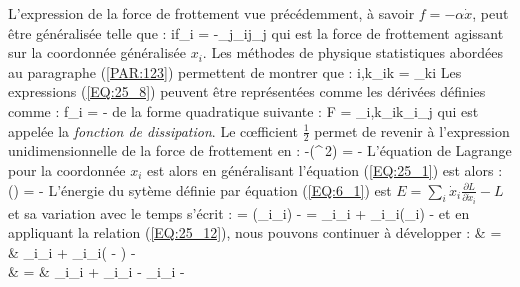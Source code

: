 L'expression de la force de frottement vue pr\'{e}c\'{e}demment, \`{a} savoir $f = -\alpha\dot{x}$, peut \^{e}tre g\'{e}n\'{e}ralis\'{e}e telle que :
\be
	\forall i\text{, }f_{i} = -\sum_{j}\alpha_{ij}_{j} \label{EQ:25_8}
\ee
qui est la force de frottement agissant sur la coordonn\'{e}e g\'{e}n\'{e}ralis\'{e}e $x_{i}$. Les m\'{e}thodes de physique statistiques abord\'{e}es au paragraphe (\ref{PAR:123}) permettent de montrer que :
\benn
	\forall i,k\text{, }\alpha_{ik} = \alpha_{ki} \label{EQ:25_9}
\eenn
Les expressions (\ref{EQ:25_8}) peuvent \^{e}tre repr\'{e}sent\'{e}es comme les d\'{e}riv\'{e}es d\'{e}finies comme :
\be
	f_{i} = - \label{EQ:25_10}
\ee
de la forme quadratique suivante :
\be
	F = \sum_{i,k}\alpha_{ik}_{i}_{j}  \label{EQ:25_11}
\ee
qui est appel\'{e}e la \emph{fonction de dissipation}. Le c{\oe}fficient $\frac{1}{2}$ permet de revenir \`{a} l'expression unidimensionnelle de la force de frottement en :
\benn
	-\left(^{\,2}\right) = -\alpha{}
\eenn
L'\'{e}quation de Lagrange pour la coordonn\'{e}e $x_{i}$ est alors en g\'{e}n\'{e}ralisant l'\'{e}quation (\ref{EQ:25_1}) est alors :
\be
	\left(\right) =  -  \label{EQ:25_12}
\ee
L'\'{e}nergie du syt\`{e}me d\'{e}finie par \'{e}quation (\ref{EQ:6_1}) est $E = \sum_{i}\dot{x}_{i}\frac{\partial L}{\partial\dot{x}_{i}} - L$ et sa variation avec le temps s'\'{e}crit :
\benn
	 = \left(\sum_{i}_{i}\right) -  = \sum_{i}_{i} + \sum_{i}_{i}\left(\sum_{i}\right) - 
\eenn
et en appliquant la relation (\ref{EQ:25_12}), nous pouvons continuer \`{a} d\'{e}velopper :
\bea
	 & = & \sum_{i}_{i} + \sum_{i}_{i}\left( - \right) -  \nonumber \\
	& = & \sum_{i}_{i} + \sum_{i}_{i} - \sum_{i}_{i} -  \nonumber
